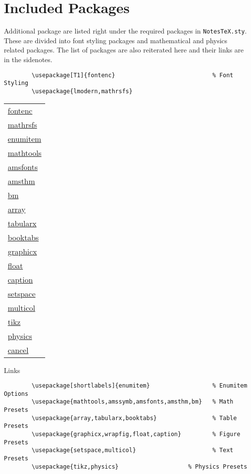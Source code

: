 \documentclass[10pt]{article}
\begin{document}
	\section{Included Packages} %
	\label{sec:incpackage}
	Additional package are listed right under the required packages in \texttt{NotesTeX.sty}. These are divided into font styling packages and mathematical and physics related packages. The list of packages are also reiterated here and their links are in the sidenotes.
	\begin{verbatim}
		\usepackage[T1]{fontenc}                            % Font Styling
		\usepackage{lmodern,mathrsfs}
	\end{verbatim}
	\begin{margintable}\footnotesize 
		\begin{tabularx}{\marginparwidth}{|X}
			\href{https://www.ctan.org/pkg/fontenc}{fontenc}\\
			\href{https://www.ctan.org/pkg/mathrsfs}{mathrsfs}\\
			\href{https://www.ctan.org/pkg/enumitem}{enumitem}\\
			\href{https://www.ctan.org/pkg/mathtools}{mathtools}\\
			\href{https://www.ctan.org/pkg/amsfonts}{amsfonts}\\
			\href{https://www.ctan.org/pkg/amsthm}{amsthm}\\
			\href{https://www.ctan.org/pkg/bm}{bm}\\
			\href{https://www.ctan.org/pkg/array}{array}\\
			\href{https://www.ctan.org/pkg/tabularx}{tabularx}\\
			\href{https://www.ctan.org/pkg/booktabs}{booktabs}\\
			\href{https://www.ctan.org/pkg/graphicx}{graphicx}\\
			\href{https://www.ctan.org/pkg/float}{float}\\
			\href{https://www.ctan.org/pkg/caption}{caption}\\
			\href{https://www.ctan.org/pkg/setspace}{setspace}\\
			\href{https://www.ctan.org/pkg/multicol}{multicol}\\
			\href{https://www.ctan.org/topic/pgf-tikz}{tikz}\\
			\href{https://www.ctan.org/pkg/physics}{physics}\\
			\href{https://www.ctan.org/pkg/cancel}{cancel}
		\end{tabularx}
		\caption{Links}
	\end{margintable}
	\begin{verbatim}
		\usepackage[shortlabels]{enumitem}                  % Enumitem Options
		\usepackage{mathtools,amssymb,amsfonts,amsthm,bm}   % Math Presets
		\usepackage{array,tabularx,booktabs}                % Table Presets
		\usepackage{graphicx,wrapfig,float,caption}         % Figure Presets
		\usepackage{setspace,multicol}                      % Text Presets
		\usepackage{tikz,physics}                    % Physics Presets
	\end{verbatim}
\end{document}

